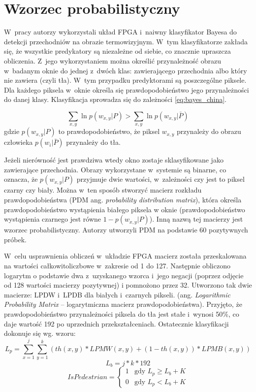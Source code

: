 \section{Wzorzec probabilistyczny}
\label{sec:xiao_2015}
W~pracy \cite{xiao_2015} autorzy wykorzystali układ FPGA i~naiwny klasyfikator Bayesa do detekcji przechodniów na obrazie termowizyjnym. 
W~tym klasyfikatorze zakłada się, że wszystkie predykatory są niezależne od siebie, co znacznie upraszcza obliczenia. 
Z~jego wykorzystaniem można określić przynależność obrazu w~badanym oknie do jednej z~dwóch klas: zawierającego przechodnia albo który nie zawiera (czyli tła). 
W~tym przypadku predyktorami są poszczególne piksele. 
Dla każdego piksela w~oknie określa się prawdopodobieństwo jego przynależności do danej klasy. 
Klasyfikacja sprowadza się do zależności \eqref{eq:bayes_china}.

\begin{equation} \label{eq:bayes_china}
\sum_{x,y} \ln p(w_{x,y}|P) > \sum_{x,y} \ln p(w_{x,y}|\bar{P})
\end{equation}
\noindent gdzie \( p(w_{x,y}|P) \) to prawdopodobieństwo, że piksel $w_{x,y}$ przynależy do obrazu człowieka
\( p(w_i|\bar{P}) \) przynależy do tła.

Jeżeli nierówność jest prawdziwa wtedy okno zostaje sklasyfikowane jako zawierające przechodnia.
Obrazy wykorzystane w~systemie są binarne, co oznacza, że \( p(w_{x,y}|P) \) przyjmuje dwie wartości, w~zależności czy jest to piksel czarny czy biały. 
Można w~ten sposób stworzyć macierz rozkładu prawdopodobieństwa (PDM ang. \textit{probability distribution matrix}), która określa prawdopodobieństwo wystąpienia białego piksela w oknie (prawdopodobieństwo wystąpienia czarnego jest równe \(1- p(w_{x,y}|P) \)). 
Inną nazwą tej macierzy jest wzorzec probabilistyczny.
Autorzy utworzyli PDM na podstawie 60 pozytywnych próbek.

W~celu usprawnienia obliczeń w~układzie FPGA macierz została przeskalowana na wartości całkowitoliczbowe w~zakresie od 1 do 127.
Następnie obliczono logarytm o podstawie dwa z~uzyskanego wzorca i~jego negacji (poprzez odjęcie od 128 wartości macierzy pozytywnej) i pomnożono przez 32.
Utworzono tak dwie macierze: LPDW i~LPDB dla białych i~czarnych pikseli. (ang. \textit{Logarithmic Probability Matrix} – logarytmiczna macierz prawdopodobieństwa).
Przyjęto, że prawdopodobieństwo przynależności piksela do tła jest stałe i~wynosi 50\%, co daje wartość 192 po uprzednich przekształceniach.
Ostatecznie klasyfikacji dokonuje się wg. wzoru:
\begin{equation}\label{equ:Lp}
L_{p} = \sum_{x=1}^{j}\sum_{y=1}^{k}(th(x,y)*LPMW(x,y)+(1-th(x,y))*LPMB(x,y))
\end{equation}
\begin{equation}\label{equ:Lb}
L_{b} = j*k*192
\end{equation}
\begin{equation} \label{equ:ispedistant}
IsPedestrian = \left\{ \begin{array}{ll}
1 & \textrm{gdy $L_{p} \geq L_{b} + K$}\\
0 & \textrm{gdy $L_{p}<L_{b} + K$}
\end{array} \right.
\end{equation}


